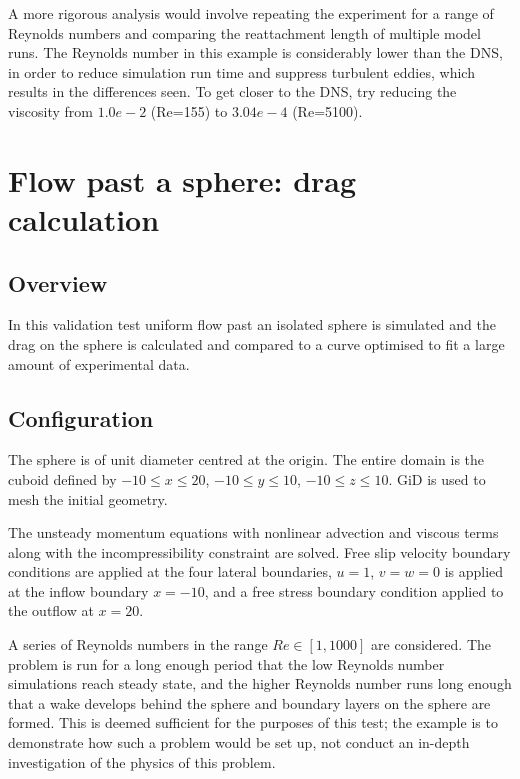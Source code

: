 A more rigorous analysis would involve repeating the experiment for a range of
Reynolds numbers and comparing the reattachment length of multiple model runs.
The Reynolds number in this example is considerably lower than the DNS,
in order to reduce simulation run time and suppress turbulent eddies, which
results in the differences seen. To get closer to the DNS, try reducing the
viscosity from $1.0e-2$ (Re=155) to $3.04e-4$ (Re=5100).


\section{Flow past a sphere: drag calculation}
\label{sec:flow_past_sphere}
\subsection{Overview}
In this validation test uniform flow past an isolated sphere is simulated
and the drag on the sphere is calculated and compared to a curve optimised
to fit a large amount of experimental data.

\subsection{Configuration}
The sphere is of unit diameter centred at the origin. The entire domain is
the cuboid defined by $-10\le x\le 20$, $-10\le y\le 10$, $-10\le z\le 10$.
GiD is used to mesh the initial geometry.

The unsteady momentum equations with nonlinear advection and viscous terms
along with the incompressibility constraint are solved. Free slip velocity
boundary conditions are applied at the four lateral boundaries, $u=1$, $v=w=0$ is
applied at the inflow boundary $x=-10$, and a free stress boundary condition
applied to the outflow at $x=20$.

A series of Reynolds numbers in the range
$Re\in [1,1000]$ are considered. The problem is run for a long enough
period that the low Reynolds number simulations reach steady state, and the
higher Reynolds number runs long enough that a wake develops behind the
sphere and boundary layers on the sphere are formed.  This is deemed
sufficient for the purposes of this test; the example is to demonstrate
how such a problem would be set up, not conduct an in-depth
investigation of the physics of this problem.

